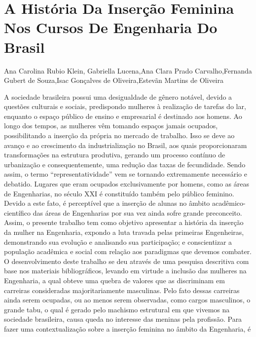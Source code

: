 


\section*{A História Da Inserção Feminina Nos Cursos De Engenharia Do Brasil}

Ana Carolina Rubio Klein, Gabriella Lucena,Ana Clara Prado Carvalho,Fernanda Gubert de Souza,Isac Gonçalves de Oliveira,Estevãn Martins de Oliveira

A sociedade brasileira possui uma desigualdade de gênero notável, devido a questões
culturais e sociais, predispondo mulheres à realização de tarefas do lar, enquanto o espaço
público de ensino e empresarial é destinado aos homens.
Ao longo dos tempos, as mulheres vêm tomando espaços jamais ocupados, possibilitando
a inserção da própria no mercado de trabalho. Isso se deve ao avanço e ao crescimento da
industrialização no Brasil, aos quais proporcionaram transformações na estrutura produtiva,
gerando um processo contínuo de urbanização e consequentemente, uma redução das taxas de
fecundidade. Sendo assim, o termo “representatividade” vem se tornando extremamente
necessário e debatido. Lugares que eram ocupados exclusivamente por homens, como as áreas de
Engenharias, no século XXI é constituído também pelo público feminino. Devido a este fato, é
perceptível que a inserção de alunas no âmbito acadêmico-científico das áreas de Engenharias
por sua vez ainda sofre grande preconceito.
Assim, o presente trabalho tem como objetivo apresentar a história da inserção da mulher
na Engenharia, expondo a luta travada pelas primeiras Engenheiras, demonstrando sua evolução
e analisando sua participação; e conscientizar a população acadêmica e social com relação aos
paradigmas que devemos combater.
O desenvolvimento deste trabalho se deu através de uma pesquisa descritiva com base
nos materiais bibliográficos, levando em virtude a inclusão das mulheres na Engenharia, a qual
obteve uma quebra de valores que as discriminam em carreiras consideradas majoritariamente
masculinas. Pelo fato dessas carreiras ainda serem ocupadas, ou ao menos serem observadas,
como cargos masculinos, o grande tabu, o qual é gerado pelo machismo estrutural em que
vivemos na sociedade brasileira, causa queda no interesse das meninas pela profissão.
Para fazer uma contextualização sobre a inserção feminina no âmbito da Engenharia, é
